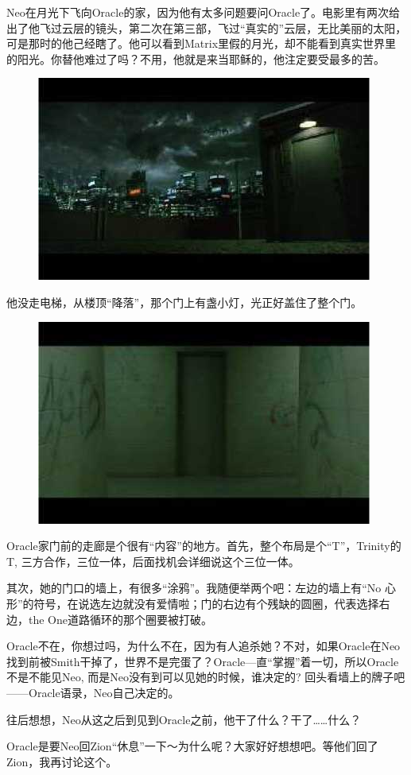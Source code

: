 \documentclass{ctexart}
\begin{document}
Neo在月光下飞向Oracle的家，因为他有太多问题要问Oracle了。电影里有两次给出了他飞过云层的镜头，第二次在第三部，飞过“真实的”云层，无比美丽的太阳，可是那时的他己经瞎了。他可以看到Matrix里假的月光，却不能看到真实世界里的阳光。你替他难过了吗？不用，他就是来当耶稣的，他注定要受最多的苦。

\begin{figure}[htb]
\centering
\includegraphics[width=0.5\linewidth]{fig/read_reloaded-28}
\end{figure}

他没走电梯，从楼顶“降落”，那个门上有盏小灯，光正好盖住了整个门。

\begin{figure}[htb]
\centering
\includegraphics[width=0.5\linewidth]{fig/read_reloaded-29}
\end{figure}

Oracle家门前的走廊是个很有“内容”的地方。首先，整个布局是个“T”，Trinity的T, 三方合作，三位一体，后面找机会详细说这个三位一体。

其次，她的门口的墙上，有很多“涂鸦”。我随便举两个吧：左边的墙上有“No 心形”的符号，在说选左边就没有爱情啦；门的右边有个残缺的圆圈，代表选择右边，the One道路循环的那个圈要被打破。

Oracle不在，你想过吗，为什么不在，因为有人追杀她？不对，如果Oracle在Neo找到前被Smith干掉了，世界不是完蛋了？Oracle—直“掌握”着一切，所以Oracle不是不能见Neo, 而是Neo没有到可以见她的时候，谁决定的? 回头看墙上的牌子吧——Oracle语录，Neo自己决定的。

往后想想，Neo从这之后到见到Oracle之前，他干了什么？干了……什么？

Oracle是要Neo回Zion“休息”一下～为什么呢？大家好好想想吧。等他们回了Zion，我再讨论这个。
\end{document}
